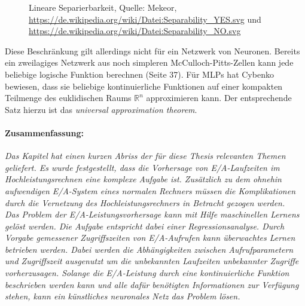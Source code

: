 \documentclass[
	12pt,
	a4paper,
	BCOR10mm,
	DIV14,
	listof=totoc,
	bibliography=totoc,
	headsepline
]{scrreprt}
\begin{document}
\begin{figure}
	\hfill
	\caption{Lineare Separierbarkeit, Quelle: Mekeor, \url{https://de.wikipedia.org/wiki/Datei:Separability_YES.svg} und \url{https://de.wikipedia.org/wiki/Datei:Separability_NO.svg}}
	\label{fig:separierbarkeit}
\end{figure} 

Diese Beschränkung gilt allerdings nicht für ein Netzwerk von Neuronen. Bereits ein zweilagiges Netzwerk aus noch simpleren McCulloch-Pitts-Zellen kann jede beliebige logische Funktion berechnen \cite{Rojas:1996:NNS:235222} (Seite 37).
Für MLPs hat Cybenko \cite{cybenko:mcss} bewiesen, dass sie beliebige kontinuierliche Funktionen auf einer kompakten Teilmenge des euklidischen Raums $\mathbb{R}^n$ approximieren kann. Der entsprechende Satz hierzu ist das \textit{universal approximation theorem}.

\bigskip
\paragraph{Zusammenfassung:}
\textit{ 
	Das Kapitel hat einen kurzen Abriss der für diese Thesis relevanten Themen geliefert. Es wurde festgestellt, dass die Vorhersage von E/A-Laufzeiten im Hochleistungsrechnen eine komplexe Aufgabe ist. Zusätzlich zu dem ohnehin aufwendigen E/A-System eines normalen Rechners müssen die Komplikationen durch die Vernetzung des Hochleistungsrechners in Betracht gezogen werden.\\
	Das Problem der E/A-Leistungsvorhersage kann mit Hilfe maschinellen Lernens gelöst werden. Die Aufgabe entspricht dabei einer Regressionsanalyse. Durch Vorgabe gemessener Zugriffszeiten von E/A-Aufrufen kann überwachtes Lernen betrieben werden. Dabei werden die Abhängigkeiten zwischen Aufrufparametern und Zugriffszeit ausgenutzt um die unbekannten Laufzeiten unbekannter Zugriffe vorherzusagen.
	Solange die E/A-Leistung durch eine kontinuierliche Funktion beschrieben werden kann und alle dafür benötigten Informationen zur Verfügung stehen, kann ein künstliches neuronales Netz das Problem lösen.
}
\end{document}
